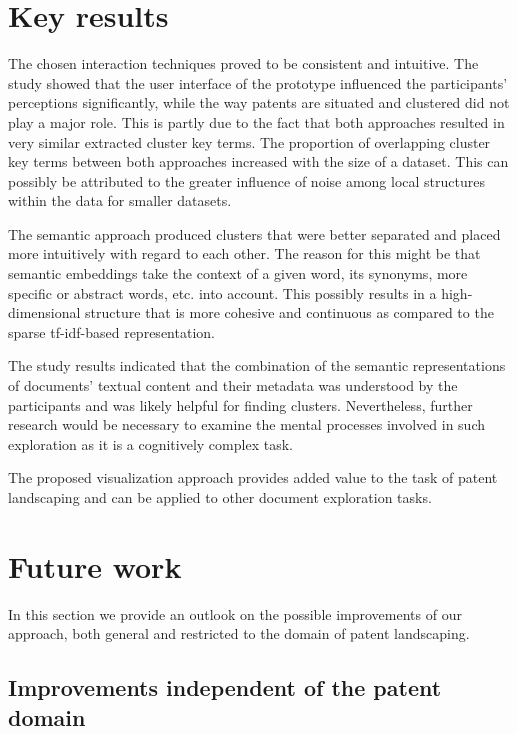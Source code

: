 \section{Key results}

The chosen interaction techniques proved to be consistent and intuitive.
The study showed that the user interface of the prototype influenced the participants' perceptions significantly, while the way patents are situated and clustered did not play a major role.
This is partly due to the fact that both approaches resulted in very similar extracted cluster key terms.
The proportion of overlapping cluster key terms between both approaches increased with the size of a dataset.
This can possibly be attributed to the greater influence of noise among local structures within the data for smaller datasets.

The semantic approach produced clusters that were better separated and placed more intuitively with regard to each other.
The reason for this might be that semantic embeddings take the context of a given word, its synonyms, more specific or abstract words, etc. into account.
This possibly results in a high-dimensional structure that is more cohesive and continuous as compared to the sparse \gls{tf-idf}-based representation.

The study results indicated that the combination of the semantic representations of documents' textual content and their metadata was understood by the participants and was likely helpful for finding clusters.
Nevertheless, further research would be necessary to examine the mental processes involved in such exploration as it is a cognitively complex task.

The proposed visualization approach provides added value to the task of patent landscaping and can be applied to other document exploration tasks.

\section{Future work}
\label{sec:future_work}

In this section we provide an outlook on the possible improvements of our approach, both general and restricted to the domain of patent landscaping.

\subsection{Improvements independent of the patent domain} 

